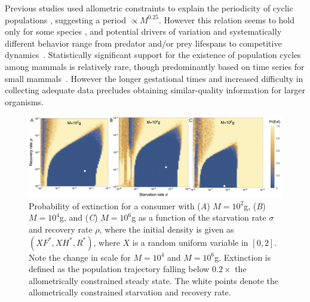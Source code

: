 \documentclass[twocolumn,preprintnumbers,amsmath,amssymb,superscriptaddress]{revtex4}
\begin{document}
\begin{bibunit}[unsrt]
Previous studies used allometric constraints to explain the periodicity of cyclic populations \cite{CalderIII:1983jd,Peterson:1984hj,Krukonis:1991fk}, suggesting a period $\propto M^{0.25}$.
However this relation seems to hold only for some species \cite{Hendriks:2012fc}, and potential drivers of variation and systematically different behavior range from predator and/or prey lifespans to competitive dynamics~\cite{Kendall:1999iy,Hogstedt:2005cr}.
Statistically significant support for the existence of population cycles among mammals is relatively rare, though predominantly based on time series for small mammals~\cite{Kendall:1998hl}.
However the longer gestational times and increased difficulty in collecting adequate data precludes obtaining similar-quality information for larger organisms.


\begin{figure}
\centering
\includegraphics[width=1\textwidth]{fig_ExtinctionAllometricComb3.png}
\caption{ Probability of extinction for a consumer with (\emph{A}) $M=10^2$g, (\emph{B}) $M=10^4$g, and (\emph{C}) $M=10^6$g as a function of the starvation rate $\sigma$ and recovery rate $\rho$, where the initial density is given as $(XF^*,XH^*,R^*)$, where $X$ is a random uniform variable in $[0,2]$. Note the change in scale for $M=10^4$ and $M=10^6$g.  Extinction is defined as the population trajectory falling below $0.2\times$ the allometrically constrained steady state. The white points denote the allometrically constrained starvation and recovery rate.}
\label{fig:ext}
\end{figure}


\end{bibunit}
\end{document}
